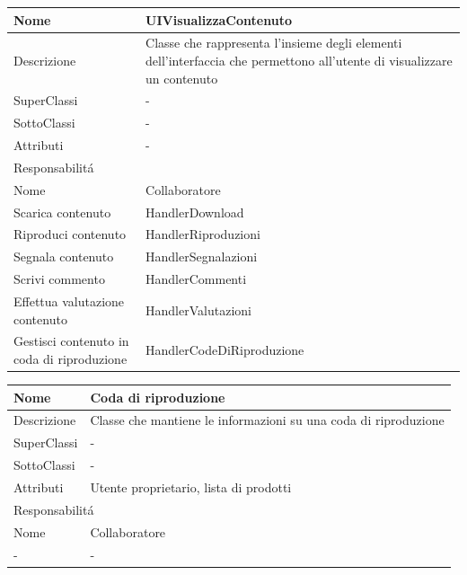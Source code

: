 \begin{center}
    \begin{longtable}{ |p{3cm}|p{3cm}|p{3cm}|p{3cm}| }
        \hline
        Nome & \multicolumn{3}{|p{9cm}|}{UIVisualizzaContenuto} \\\hline
        Descrizione & \multicolumn{3}{|p{9cm}|}{Classe che rappresenta l'insieme degli elementi dell'interfaccia che permettono all'utente di visualizzare un contenuto} \\\hline
        SuperClassi & \multicolumn{3}{|p{9cm}|}{-} \\\hline
        SottoClassi & \multicolumn{3}{|p{9cm}|}{-} \\\hline
        Attributi & \multicolumn{3}{|p{9cm}|}{-} \\\hline
        \multicolumn{4}{|p{12cm}|}{Responsabilit\'a} \\\hline
        \multicolumn{2}{|p{5cm}|}{Nome} & \multicolumn{2}{|p{7cm}|}{Collaboratore} \\\hline
        \multicolumn{2}{|p{5cm}|}{Scarica contenuto} & \multicolumn{2}{|p{7cm}|}{HandlerDownload} \\\hline
        \multicolumn{2}{|p{5cm}|}{Riproduci contenuto} & \multicolumn{2}{|p{7cm}|}{HandlerRiproduzioni} \\\hline
        \multicolumn{2}{|p{5cm}|}{Segnala contenuto} & \multicolumn{2}{|p{7cm}|}{HandlerSegnalazioni} \\\hline
        \multicolumn{2}{|p{5cm}|}{Scrivi commento} & \multicolumn{2}{|p{7cm}|}{HandlerCommenti} \\\hline
        \multicolumn{2}{|p{5cm}|}{Effettua valutazione contenuto} & \multicolumn{2}{|p{7cm}|}{HandlerValutazioni} \\\hline
        \multicolumn{2}{|p{5cm}|}{Gestisci contenuto in coda di riproduzione} & \multicolumn{2}{|p{7cm}|}{HandlerCodeDiRiproduzione} \\\hline
    \end{longtable}
\end{center}

\begin{center}
    \begin{tabular}{ |p{3cm}|p{3cm}|p{3cm}|p{3cm}| }
        \hline
        Nome & \multicolumn{3}{|p{9cm}|}{Coda di riproduzione} \\\hline
        Descrizione & \multicolumn{3}{|p{9cm}|}{Classe che mantiene le informazioni su una coda di riproduzione} \\\hline
        SuperClassi & \multicolumn{3}{|p{9cm}|}{-} \\\hline
        SottoClassi & \multicolumn{3}{|p{9cm}|}{-} \\\hline
        Attributi & \multicolumn{3}{|p{9cm}|}{Utente proprietario, lista di prodotti} \\\hline
        \multicolumn{4}{|p{12cm}|}{Responsabilit\'a} \\\hline
        \multicolumn{2}{|p{6cm}|}{Nome} & \multicolumn{2}{|p{6cm}|}{Collaboratore} \\\hline
        \multicolumn{2}{|p{6cm}|}{-} & \multicolumn{2}{|p{6cm}|}{-} \\\hline
    \end{tabular}
\end{center}

